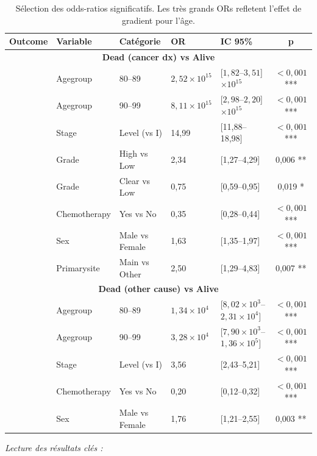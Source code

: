 \documentclass[12pt,a4paper]{article}
\begin{document}
\begin{table}[H]
\centering
\caption{Sélection des odds-ratios significatifs. Les très grands ORs refletent l'effet de gradient pour l'âge.}
\label{tab:odds_ratios_key}
\small
\begin{tabular}{@{}lllllc@{}}
\toprule
\textbf{Outcome} & \textbf{Variable} & \textbf{Catégorie} & \textbf{OR} & \textbf{IC 95\%} & \textbf{p} \\
\midrule
\multicolumn{6}{c}{\textbf{Dead (cancer dx) vs Alive}} \\
\midrule
 & Agegroup & 80–89 & $2{,}52 \times 10^{15}$ & [$1{,}82$–$3{,}51$] $\times 10^{15}$ & $<0{,}001$ *** \\
 & Agegroup & 90–99 & $8{,}11 \times 10^{15}$ & [$2{,}98$–$2{,}20$] $\times 10^{15}$ & $<0{,}001$ *** \\
 & Stage & Level (vs I) & 14{,}99 & [11{,}88–18{,}98] & $<0{,}001$ *** \\
 & Grade & High vs Low & 2{,}34 & [1{,}27–4{,}29] & 0{,}006 ** \\
 & Grade & Clear vs Low & 0{,}75 & [0{,}59–0{,}95] & 0{,}019 * \\
 & Chemotherapy & Yes vs No & 0{,}35 & [0{,}28–0{,}44] & $<0{,}001$ *** \\
 & Sex & Male vs Female & 1{,}63 & [1{,}35–1{,}97] & $<0{,}001$ *** \\
 & Primarysite & Main vs Other & 2{,}50 & [1{,}29–4{,}83] & 0{,}007 ** \\
\midrule
\multicolumn{6}{c}{\textbf{Dead (other cause) vs Alive}} \\
\midrule
 & Agegroup & 80–89 & $1{,}34 \times 10^{4}$ & [$8{,}02 \times 10^{3}$–$2{,}31 \times 10^{4}$] & $<0{,}001$ *** \\
 & Agegroup & 90–99 & $3{,}28 \times 10^{4}$ & [$7{,}90 \times 10^{3}$–$1{,}36 \times 10^{5}$] & $<0{,}001$ *** \\
 & Stage & Level (vs I) & 3{,}56 & [2{,}43–5{,}21] & $<0{,}001$ *** \\
 & Chemotherapy & Yes vs No & 0{,}20 & [0{,}12–0{,}32] & $<0{,}001$ *** \\
 & Sex & Male vs Female & 1{,}76 & [1{,}21–2{,}55] & 0{,}003 ** \\
\bottomrule
\end{tabular}
\end{table}

\textit{Lecture des résultats clés :}
\end{document}
